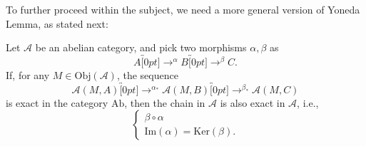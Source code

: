 \documentclass[../category_theory.tex]{subfiles}
\begin{document}
To further proceed within the subject, we need a more general version of Yoneda Lemma, as stated next:
\begin{theorem*}
	Let \(\mathcal{A}\) be an abelian category, and pick two morphisms \(\alpha , \beta \) as
	\[
		A\overbracket[0pt]{\rightarrow}^{\alpha }B\overbracket[0pt]{\rightarrow}^{\beta }C.
	\]
	If, for any \(M\in \mathrm{Obj}(\mathcal{A})\), the sequence
	\[
		\mathcal{A}(M, A)\overbracket[0pt]{\rightarrow}^{\alpha_{*}} \mathcal{A}(M, B)\overbracket[0pt]{\rightarrow}^{\beta_{*}}\mathcal{A}(M, C)
	\]
	is exact in the category \(\mathrm{Ab}\), then the chain in \(\mathcal{A}\) is also exact in \(\mathcal{A}\), i.e.,
	\[
		\left\{\begin{array}{ll}
			\beta\circ \alpha \\
			\mathrm{Im}(\alpha )=\mathrm{Ker}(\beta ).
		\end{array}\right.
	\]
\end{theorem*}
\end{document}
